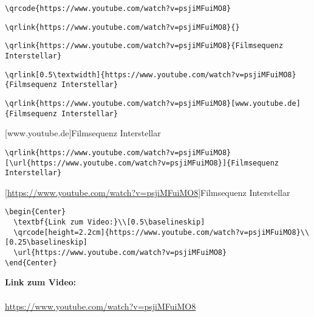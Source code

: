 \documentclass[]{arbeitsblatt}
\begin{document}
\begin{verbatim}
\qrcode{https://www.youtube.com/watch?v=psjiMFuiMO8}
\end{verbatim}




\begin{verbatim}
\qrlink{https://www.youtube.com/watch?v=psjiMFuiMO8}{}
\end{verbatim}




\begin{verbatim}
\qrlink{https://www.youtube.com/watch?v=psjiMFuiMO8}{Filmsequenz Interstellar}
\end{verbatim}




\begin{verbatim}
\qrlink[0.5\textwidth]{https://www.youtube.com/watch?v=psjiMFuiMO8}{Filmsequenz Interstellar}
\end{verbatim}




\begin{verbatim}
\qrlink{https://www.youtube.com/watch?v=psjiMFuiMO8}[www.youtube.de]{Filmsequenz Interstellar}
\end{verbatim}

[www.youtube.de]{Filmsequenz Interstellar}



\begin{verbatim}
\qrlink{https://www.youtube.com/watch?v=psjiMFuiMO8}[\url{https://www.youtube.com/watch?v=psjiMFuiMO8}]{Filmsequenz Interstellar}
\end{verbatim}

[\url{https://www.youtube.com/watch?v=psjiMFuiMO8}]{Filmsequenz Interstellar}



\begin{verbatim}
\begin{Center}
  \textbf{Link zum Video:}\\[0.5\baselineskip]
  \qrcode[height=2.2cm]{https://www.youtube.com/watch?v=psjiMFuiMO8}\\[0.25\baselineskip]
  \url{https://www.youtube.com/watch?v=psjiMFuiMO8}
\end{Center}
\end{verbatim}

\begin{Center}
  \textbf{Link zum Video:}\\[0.5\baselineskip]
  \\[0.25\baselineskip]
  \url{https://www.youtube.com/watch?v=psjiMFuiMO8}
\end{Center}
\end{document}
